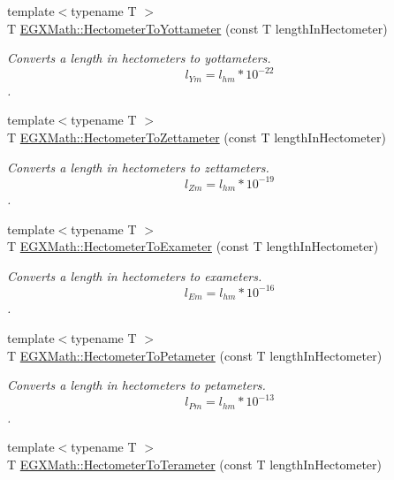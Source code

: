 \begin{DoxyCompactItemize}
{\footnotesize template$<$typename T $>$ }\\T \mbox{\hyperlink{group___e_g_x_math-_conversions-_length_conversions-_s_i-_hectometer-_s_i_ga6e5db7fe650b044f73f505673d7e484d}{E\+G\+X\+Math\+::\+Hectometer\+To\+Yottameter}} (const T length\+In\+Hectometer)
\begin{DoxyCompactList}\small\item\em Converts a length in hectometers to yottameters. \[ l_{Ym}=l_{hm} * 10^{-22} \]. \end{DoxyCompactList}\item 
{\footnotesize template$<$typename T $>$ }\\T \mbox{\hyperlink{group___e_g_x_math-_conversions-_length_conversions-_s_i-_hectometer-_s_i_ga72ca6c210560d06577273cb2c1e44250}{E\+G\+X\+Math\+::\+Hectometer\+To\+Zettameter}} (const T length\+In\+Hectometer)
\begin{DoxyCompactList}\small\item\em Converts a length in hectometers to zettameters. \[ l_{Zm}=l_{hm} * 10^{-19} \]. \end{DoxyCompactList}\item 
{\footnotesize template$<$typename T $>$ }\\T \mbox{\hyperlink{group___e_g_x_math-_conversions-_length_conversions-_s_i-_hectometer-_s_i_ga613414d30b834e129c315c144e7e01f7}{E\+G\+X\+Math\+::\+Hectometer\+To\+Exameter}} (const T length\+In\+Hectometer)
\begin{DoxyCompactList}\small\item\em Converts a length in hectometers to exameters. \[ l_{Em}=l_{hm} * 10^{-16} \]. \end{DoxyCompactList}\item 
{\footnotesize template$<$typename T $>$ }\\T \mbox{\hyperlink{group___e_g_x_math-_conversions-_length_conversions-_s_i-_hectometer-_s_i_ga212c05cda0b3776419e97ae7b3e0158a}{E\+G\+X\+Math\+::\+Hectometer\+To\+Petameter}} (const T length\+In\+Hectometer)
\begin{DoxyCompactList}\small\item\em Converts a length in hectometers to petameters. \[ l_{Pm}=l_{hm} * 10^{-13} \]. \end{DoxyCompactList}\item 
{\footnotesize template$<$typename T $>$ }\\T \mbox{\hyperlink{group___e_g_x_math-_conversions-_length_conversions-_s_i-_hectometer-_s_i_ga12cec764ceb52e7120b503f8f12ed4a2}{E\+G\+X\+Math\+::\+Hectometer\+To\+Terameter}} (const T length\+In\+Hectometer)

\end{DoxyCompactItemize}
